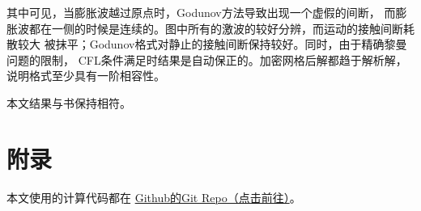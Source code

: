 \documentclass[UTF8,zihao=5]{ctexart} %
\begin{document}
其中可见，当膨胀波越过原点时，Godunov方法导致出现一个虚假的间断，
而膨胀波都在一侧的时候是连续的。图中所有的激波的较好分辨，而运动的接触间断耗散较大
被抹平；Godunov格式对静止的接触间断保持较好。同时，由于精确黎曼问题的限制，
CFL条件满足时结果是自动保正的。加密网格后解都趋于解析解，说明格式至少具有一阶相容性。

本文结果与书\cite{2013Riemann}保持相符。

{}



\section*{附录}

本文使用的计算代码都在
\href{https://github.com/harryzhou2000/HW_ACFD}{Github的Git Repo（点击前往）}。


























\end{document}
